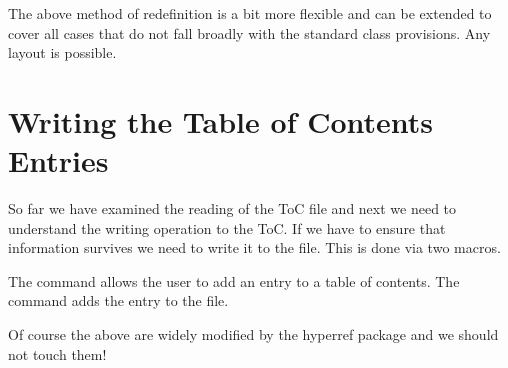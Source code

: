 The above method of redefinition is a bit more flexible and can be extended to cover all cases that do not fall broadly with the standard class provisions. Any layout is possible.


\section{Writing the Table of Contents Entries}

So far we have examined the reading of the ToC file and next we need to understand the writing operation
to the ToC. If we have to ensure that information survives we need to write it to the file. This is done via two macros.




\begin{macro}{\addcontentsline}
The  command allows the user to add an entry to a table of contents. The command adds the entry
 to the  file.
\end{macro}


\begin{teX}       
 \long{}
\end{teX}

\begin{teX}
\def\addcontentsline#1#2#3{%
  \addtocontents{#1}{\protect\contentsline{#2}{#3}{\thepage}}}

\def\contentsline#1{\csname l@#1\endcsname}
\end{teX}

Of course the above are widely modified by the hyperref package and we should not touch them!

